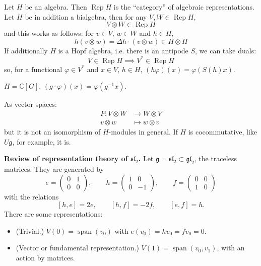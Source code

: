 Let $H$ be an algebra. Then
$\operatorname{Rep}H$ is the ``category''
of algebraic representations. Let $H$ be
in addition a bialgebra, then for any
$V,W\in \operatorname{Rep}H$,
$$
V\otimes W\in \operatorname{Rep}H
$$
and this works as follows: for
$v\in V$, $w\in W$ and $h \in H$,
$$
h(v\otimes w)=\Delta h\cdot
(v\otimes w)\in H\otimes H
$$
If additionally $H$ is a Hopf algebra,
i.e. there is an antipode $S$, we can
take duals:
$$
V\in \operatorname{Rep}H\implies
V^{*}\in \operatorname{Rep}H
$$
so, for a functional $\varphi \in V^{*}$
and $x\in V$, $h\in H$,
$(h\varphi)(x)=\varphi (S(h)x)$.

\begin{example}
\label{example-l1-group-algebra}
$H=\mathbb{C}[G]$,
$(g\cdot \varphi)(x)=\varphi (g^{-1}x)$.
\end{example}

\begin{remark}
\label{remark-l1-permutation}
As vector spaces:
$$
\begin{aligned}
P: V\otimes W &\longrightarrow
W\otimes V \\
v\otimes w &\longmapsto w\otimes v
\end{aligned}
$$
but it is not an isomorphism of
$H$-modules in general. If $H$ is
cocommutative, like $U\mathfrak{g}$, for
example, it is.
\end{remark}

\medskip\noindent
{\bf Review of representation theory of
$\mathfrak{sl}_{2}$.}
Let $\mathfrak{g}=\mathfrak{sl}_{2}\subset
\mathfrak{gl}_{2}$, the traceless
matrices. They are generated by
$$
e=\begin{pmatrix} 0&1\\0&0 \end{pmatrix},
\qquad
h=\begin{pmatrix} 1&0\\0&-1 \end{pmatrix},
\qquad
f=\begin{pmatrix} 0&0\\1&0 \end{pmatrix}
$$
with the relations
$$
[h,e]=2e,\qquad [h,f]=-2f,
\qquad [e,f]=h.
$$
There are some representations:
\begin{itemize}
\item (Trivial.) $V(0)=
\operatorname{span}(v_{0})$ with
$e(v_{0})=hv_{0}=fv_{0}=0$.
\item (Vector or fundamental
representation.) $V(1)=
\operatorname{span}(v_{0},v_{1})$, with an
action by matrices.
\end{itemize}

